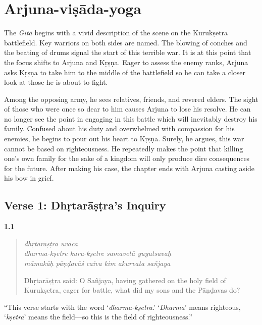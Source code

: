 \chapter{Arjuna-viṣāda-yoga}\label{chap-arjuna-visada-yoga}

\noindent The \textit{Gītā} begins with a vivid description of the scene on the Kurukṣetra battlefield. Key warriors on both sides are named. The blowing of conches and the beating of drums signal the start of this terrible war. It is at this point that the focus shifts to Arjuna and Kṛṣṇa. Eager to assess the enemy ranks, Arjuna asks Kṛṣṇa to take him to the middle of the battlefield so he can take a closer look at those he is about to fight.

Among the opposing army, he sees relatives, friends, and revered elders. The sight of those who were once so dear to him causes Arjuna to lose his resolve. He can no longer see the point in engaging in this battle which will inevitably destroy his family. Confused about his duty and overwhelmed with compassion for his enemies, he begins to pour out his heart to Kṛṣṇa. Surely, he argues, this war cannot be based on righteousness. He repeatedly makes the point that killing one’s own family for the sake of a kingdom will only produce dire consequences for the future. After making his case, the chapter ends with Arjuna casting aside his bow in grief.

\section{Verse 1: Dhṛtarāṣṭra's Inquiry}\label{sec-verse-1-dhrtarastra-s-inquiry}


\par\noindent\textbf{1.1}\par
\begin{verse}
\textit{dhṛtarāṣṭra uvāca} \\
\textit{dharma-kṣetre kuru-kṣetre samavetā yuyutsavaḥ} \\
\textit{māmakāḥ pāṇḍavāś caiva kim akurvata sañjaya}

\noindent Dhṛtarāṣṭra said: O Sañjaya, having gathered on the holy field of Kurukṣetra, eager for battle, what did my sons and the Pāṇḍavas do?
\end{verse}
\par


\enquote{This verse starts with the word \enquote{\textit{dharma-kṣetra}.} \enquote{\textit{Dharma}} means righteous, \enquote{\textit{kṣetra}} means the field---so this is the field of righteousness.}

